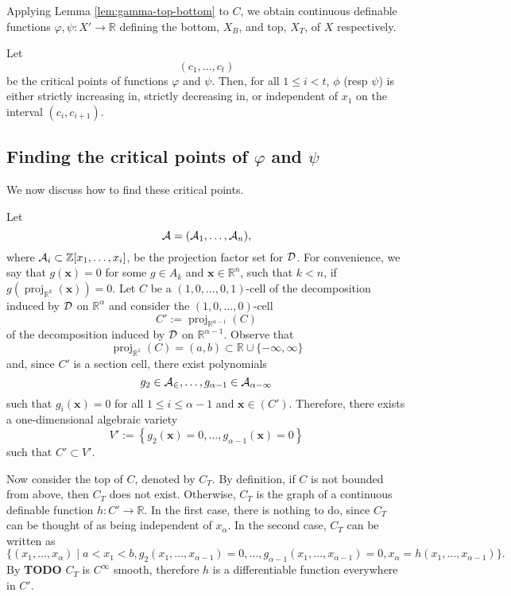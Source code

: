 \documentclass[
]{book}
\theoremstyle{definition}
\theoremstyle{definition}
\theoremstyle{definition}
\theoremstyle{definition}
\theoremstyle{remark}
\begin{document}
Applying Lemma \ref{lem:gamma-top-bottom} to \(C\), we obtain continuous definable functions \(\varphi,\psi : X' \to \mathbb{R}\) defining the bottom, \(X_B\), and top, \(X_T\), of \(X\) respectively.

Let \[
(c_1,\ldots,c_t)
\]
be the critical points of functions \(\varphi\) and \(\psi\). Then, for all \(1 \le i < t\), \(\phi\) (resp \(\psi\)) is either strictly increasing in, strictly decreasing in, or independent of \(x_1\) on the interval \((c_i, c_{i+1})\).

\hypertarget{sec:lagrange-refinement}{%
\subsection{\texorpdfstring{Finding the critical points of \(\varphi\) and \(\psi\)}{Finding the critical points of \textbackslash varphi and \textbackslash psi}}\label{sec:lagrange-refinement}}

We now discuss how to find these critical points.

Let
\begin{equation}
{\cal A} = ({\cal A}_1,\ldots,{\cal A}_n),
\label{eq:proj-fac-set}
\end{equation}
where \({\cal A}_i \subset \mathbb{Z}[x_1,\ldots,x_i]\), be the projection factor set for \(\cal D\). For convenience, we say that \(g(\mathbf{x}) = 0\) for some \(g \in A_k\) and \(\mathbf{x} \in \mathbb{R}^n\), such that \(k < n\), if \(g({\operatorname{proj}_{\mathbb{R}^{k}}}(\mathbf{x})) = 0\).
Let \(C\) be a \((1,0,\ldots,0,1)\)-cell of the decomposition induced by \(\cal D\) on \(\mathbb{R}^{\alpha}\) and consider the \((1,0,\ldots,0)\)-cell
\[
C' := {\operatorname{proj}_{\mathbb{R}^{\alpha - 1}}}(C)
\]
of the decomposition induced by \(\cal D\) on \(\mathbb{R}^{\alpha - 1}\). Observe that
\[
{\operatorname{proj}_{\mathbb{R}^{1}}}(C) = (a,b) \subset \mathbb{R}\cup \{-\infty, \infty\}
\]
and, since \(C'\) is a section cell, there exist polynomials
\[
g_2 \in {\cal A_2},\ldots,g_{\alpha - 1} \in {\cal A_{\alpha - 1}}
\] such that \(g_i(\mathbf{x}) = 0\) for all \(1\le i \le \alpha - 1\) and \(\mathbf{x} \in (C')\).
Therefore, there exists a one-dimensional algebraic variety
\[
V' := \left\{ g_2(\mathbf{x}) = 0, \ldots, g_{\alpha - 1}(\mathbf{x}) = 0 \right\}
\]
such that \(C' \subset V'\).

Now consider the top of \(C\), denoted by \(C_T\).
By definition, if \(C\) is not bounded from above, then \(C_T\) does not exist. Otherwise, \(C_T\) is the graph of a continuous definable function \(h : C' \to \mathbb{R}\).
In the first case, there is nothing to do, since \(C_T\) can be thought of as being independent of \(x_\alpha\).
In the second case, \(C_T\) can be written as
\begin{equation}
\{ (x_1,\ldots,x_\alpha) \mid a < x_1 < b, g_2(x_1,\ldots,x_{\alpha - 1}) = 0, \ldots, g_{\alpha - 1}(x_1,\ldots,x_{\alpha - 1}) = 0, x_\alpha = h(x_1,\ldots,x_{\alpha - 1}) \}.
\label{eq:c-alpha-top}
\end{equation}
By \textbf{TODO} \(C_T\) is \(C^\infty\) smooth, therefore \(h\) is a differentiable function everywhere in \(C'\).
\end{document}
